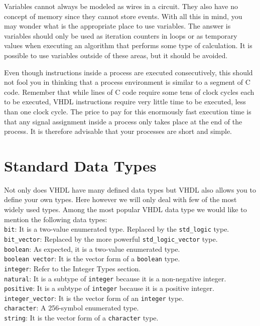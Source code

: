 Variables cannot always be modeled as wires in a circuit. They also have no concept of memory since they cannot store events. With all this in mind, you may wonder what is the appropriate place to use variables. The answer is variables should only be used as iteration counters in loops or as temporary values when executing an algorithm that performs some type of calculation. It is possible to use variables outside of these areas, but it should be avoided.

Even though instructions inside a process are executed consecutively, this should not fool you in thinking that a process environment is similar to a segment of C code. Remember that while lines of C code require some tens of clock cycles each to be executed, VHDL instructions require very little time to be executed, less than one clock cycle. The price to pay for this enormously fast execution time is that any signal assignment inside a process only takes place at the end of the process. It is therefore advisable that your processes are short and simple.

\section{Standard Data Types}
Not only does VHDL have many defined data types but VHDL also allows you to define your own types. Here however we will only deal with few of the most widely used types. Among the most popular VHDL data type we would like to mention the following data types:\\

\noindent
\texttt{bit}: It is a two-value enumerated type. Replaced by the \texttt{std\_logic} type.\\
\texttt{bit\_vector}: Replaced by the more powerful \texttt{std\_logic\_vector} type.\\
\texttt{boolean}: As expected, it is a two-value enumerated type.\\
\texttt{boolean vector}: It is the vector form of a \texttt{boolean} type.\\
\texttt{integer}: Refer to the Integer Types section.\\
\texttt{natural}: It is a subtype of \texttt{integer} because it is a non-negative integer.\\
\texttt{positive}: It is a subtype of \texttt{integer} because it is a positive integer.\\
\texttt{integer\_vector}: It is the vector form of an \texttt{integer} type.\\
\texttt{character}: A 256-symbol enumerated type.\\
\texttt{string}: It is the vector form of a \texttt{character} type.\\

